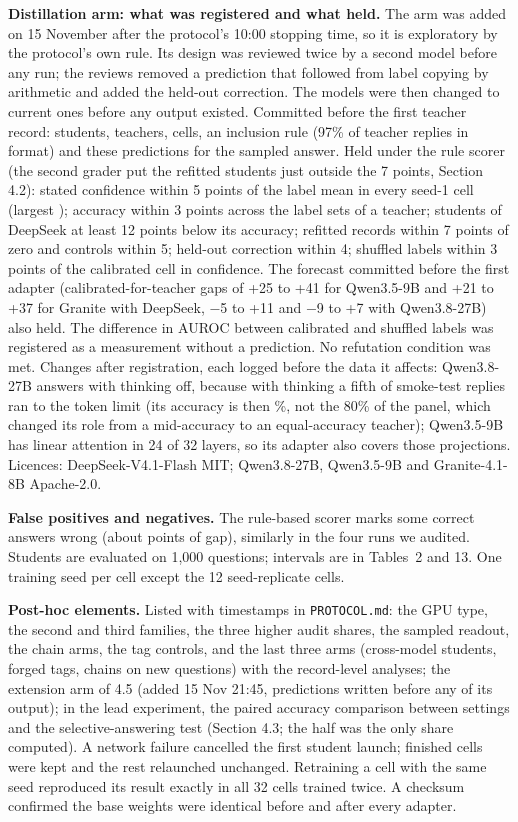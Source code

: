 \documentclass[10pt]{article}
\begin{document}
\textbf{Distillation arm: what was registered and what held.} The arm was added on 15 November after the protocol's 10:00 stopping time, so it is exploratory by the protocol's own rule. Its design was reviewed twice by a second model before any run; the reviews removed a prediction that followed from label copying by arithmetic and added the held-out correction. The models were then changed to current ones before any output existed. Committed before the first teacher record: students, teachers, cells, an inclusion rule (97\% of teacher replies in format) and these predictions for the sampled answer. Held under the rule scorer (the second grader put the refitted students just outside the 7 points, Section 4.2): stated confidence within 5 points of the label mean in every seed-1 cell (largest \dCopyMax{}); accuracy within 3 points across the label sets of a teacher; students of DeepSeek at least 12 points below its accuracy; refitted records within 7 points of zero and controls within 5; held-out correction within 4; shuffled labels within 3 points of the calibrated cell in confidence. The forecast committed before the first adapter (calibrated-for-teacher gaps of +25 to +41 for Qwen3.5-9B and +21 to +37 for Granite with DeepSeek, $-$5 to +11 and $-$9 to +7 with Qwen3.8-27B) also held. The difference in AUROC between calibrated and shuffled labels was registered as a measurement without a prediction. No refutation condition was met. Changes after registration, each logged before the data it affects: Qwen3.8-27B answers with thinking off, because with thinking a fifth of smoke-test replies ran to the token limit (its accuracy is then \dMTeacherAcc{}\%, not the 80\% of the panel, which changed its role from a mid-accuracy to an equal-accuracy teacher); Qwen3.5-9B has linear attention in 24 of 32 layers, so its adapter also covers those projections. Licences: DeepSeek-V4.1-Flash MIT; Qwen3.8-27B, Qwen3.5-9B and Granite-4.1-8B Apache-2.0.

\textbf{False positives and negatives.} The rule-based scorer marks some correct answers wrong (about \scoreOffset{} points of gap), similarly in the four runs we audited. Students are evaluated on 1{,}000 questions; intervals are in Tables~2 and 13. One training seed per cell except the 12 seed-replicate cells.

\textbf{Post-hoc elements.} Listed with timestamps in \texttt{PROTOCOL.md}: the GPU type, the second and third families, the three higher audit shares, the sampled readout, the chain arms, the tag controls, and the last three arms (cross-model students, forged tags, chains on new questions) with the record-level analyses; the extension arm of 4.5 (added 15 Nov 21:45, predictions written before any of its output); in the lead experiment, the paired accuracy comparison between settings and the selective-answering test (Section 4.3; the half was the only share computed). A network failure cancelled the first student launch; finished cells were kept and the rest relaunched unchanged. Retraining a cell with the same seed reproduced its result exactly in all 32 cells trained twice. A checksum confirmed the base weights were identical before and after every adapter.
\end{document}

